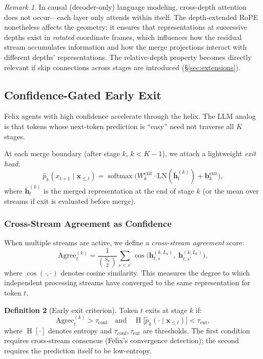 \documentclass[11pt,a4paper]{article}
\theoremstyle{definition}
\newtheorem{definition}{Definition}[section]
\theoremstyle{plain}
\theoremstyle{remark}
\newtheorem{remark}[definition]{Remark}
\newcommand{\softmax}{\operatorname{softmax}}
\newcommand{\Ent}{\operatorname{H}}
\begin{document}
\begin{remark}
In causal (decoder-only) language modeling, cross-depth attention does not 
occur---each layer only attends within itself. The depth-extended RoPE 
nonetheless affects the geometry: it ensures that representations at 
successive depths exist in \emph{rotated} coordinate frames, which 
influences how the residual stream accumulates information and how the 
merge projections interact with different depths' representations. The 
relative-depth property becomes directly relevant if skip connections 
across stages are introduced (\S\ref{sec:extensions}).
\end{remark}

\subsection{Confidence-Gated Early Exit}\label{sec:early-exit}

Felix agents with high confidence accelerate through the helix. The LLM 
analog is that tokens whose next-token prediction is ``easy'' need not 
traverse all $K$ stages.

At each merge boundary (after stage $k$, $k < K-1$), we attach a 
lightweight \emph{exit head}:
\begin{equation}\label{eq:exit-head}
  \hat{p}_k(x_{t+1} \mid \mathbf{x}_{\leq t}) = 
  \softmax\bigl(W_k^{\text{exit}} \cdot 
  \text{LN}(\bar{\mathbf{h}}_t^{(k)}) + \mathbf{b}_k^{\text{exit}}\bigr),
\end{equation}
where $\bar{\mathbf{h}}_t^{(k)}$ is the merged representation at the end 
of stage $k$ (or the mean over streams if exit is evaluated before merge).

\subsubsection{Cross-Stream Agreement as Confidence}

When multiple streams are active, we define a \emph{cross-stream 
agreement} score:
\begin{equation}\label{eq:agreement}
  \text{Agree}_t^{(k)} = \frac{1}{\binom{S_k}{2}} 
  \sum_{s < s'} \cos\bigl(\mathbf{h}_{t,s}^{(k, L_k)},\; 
  \mathbf{h}_{t,s'}^{(k, L_k)}\bigr),
\end{equation}
where $\cos(\cdot, \cdot)$ denotes cosine similarity. This measures the 
degree to which independent processing streams have converged to the same 
representation for token $t$.

\begin{definition}[Early exit criterion]\label{def:exit}
Token $t$ exits at stage $k$ if:
\begin{equation}\label{eq:exit-crit}
  \text{Agree}_t^{(k)} > \tau_{\text{conf}} 
  \quad\text{and}\quad 
  \Ent\bigl[\hat{p}_k(\cdot \mid \mathbf{x}_{\leq t})\bigr] < 
  \tau_{\text{ent}},
\end{equation}
where $\Ent[\cdot]$ denotes entropy and $\tau_{\text{conf}}, 
\tau_{\text{ent}}$ are thresholds. The first condition requires 
cross-stream consensus (Felix's convergence detection); the second 
requires the prediction itself to be low-entropy.
\end{definition}
\end{document}
